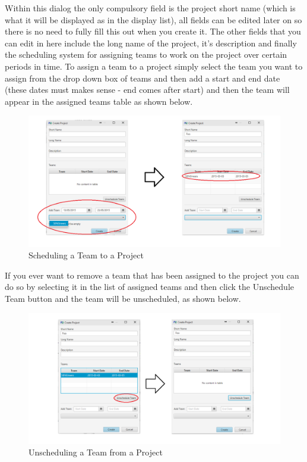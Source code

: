 Within this dialog the only compulsory field is the project short name (which is what it will be displayed as in the display list), all fields can be edited later on so there is no need to fully fill this out when you create it.
\newline
The other fields that you can edit in here include the long name of the project, it's description and finally the scheduling system for assigning teams to work on the project over certain periods in time. To assign a team to a project simply select the team you want to assign from the drop down box of teams and then add a start and end date (these dates must makes sense - end comes after start) and then the team will appear in the assigned teams table as shown below.

\begin{figure}[H]
\centering
\includegraphics[width=\textwidth]{images/screenshots/projects2.PNG}
\caption{Scheduling a Team to a Project}
\label{fig:new_project}
\end{figure}

If you ever want to remove a team that has been assigned to the project you can do so by selecting it in the list of assigned teams and then click the Unschedule Team button and the team will be unscheduled, as shown below.

\begin{figure}[H]
\centering
\includegraphics[width=\textwidth]{images/screenshots/projects3.PNG}
\caption{Unscheduling a Team from a Project}
\label{fig:new_project}
\end{figure}

